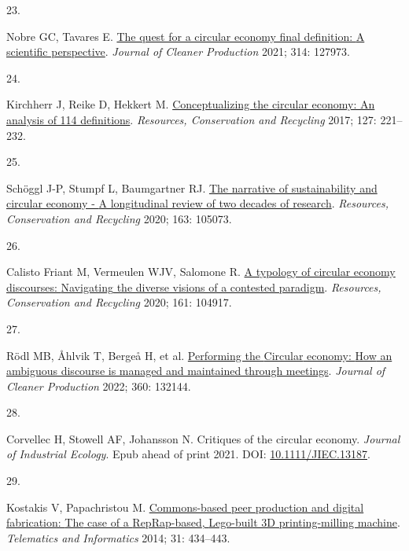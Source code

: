 \documentclass[
  12pt,
  a4paperpaper,
  onecolumn]{article}
\newlength{\cslhangindent}
\newlength{\csllabelwidth}
\newlength{\cslentryspacingunit} %
\newenvironment{CSLReferences}[2] %
 {%
  \setlength{\parindent}{0pt}
  \ifodd #1
  \let\oldpar\par
  \def\par{\hangindent=\cslhangindent\oldpar}
  \fi
  \setlength{\parskip}{#2\cslentryspacingunit}
 }%
 {}
\newcommand{\CSLLeftMargin}[1]{\parbox[t]{\csllabelwidth}{#1}}
\newcommand{\CSLRightInline}[1]{\parbox[t]{\linewidth - \csllabelwidth}{#1}\break}
\begin{document}
\begin{CSLReferences}{0}{0}
\leavevmode{}%
\CSLLeftMargin{23. }%
\CSLRightInline{Nobre GC, Tavares E.
\href{https://doi.org/10.1016/j.jclepro.2021.127973}{The quest for a
circular economy final definition: {A} scientific perspective}.
\emph{Journal of Cleaner Production} 2021; 314: 127973.}

\leavevmode{}%
\CSLLeftMargin{24. }%
\CSLRightInline{Kirchherr J, Reike D, Hekkert M.
\href{https://doi.org/10.1016/j.resconrec.2017.09.005}{Conceptualizing
the circular economy: {An} analysis of 114 definitions}.
\emph{Resources, Conservation and Recycling} 2017; 127: 221--232.}

\leavevmode{}%
\CSLLeftMargin{25. }%
\CSLRightInline{Schöggl J-P, Stumpf L, Baumgartner RJ.
\href{https://doi.org/10.1016/j.resconrec.2020.105073}{The narrative of
sustainability and circular economy - {A} longitudinal review of two
decades of research}. \emph{Resources, Conservation and Recycling} 2020;
163: 105073.}

\leavevmode{}%
\CSLLeftMargin{26. }%
\CSLRightInline{Calisto Friant M, Vermeulen WJV, Salomone R.
\href{https://doi.org/10.1016/j.resconrec.2020.104917}{A typology of
circular economy discourses: {Navigating} the diverse visions of a
contested paradigm}. \emph{Resources, Conservation and Recycling} 2020;
161: 104917.}

\leavevmode{}%
\CSLLeftMargin{27. }%
\CSLRightInline{Rödl MB, Åhlvik T, Bergeå H, et al.
\href{https://doi.org/10.1016/J.JCLEPRO.2022.132144}{Performing the
{Circular} economy: {How} an ambiguous discourse is managed and
maintained through meetings}. \emph{Journal of Cleaner Production} 2022;
360: 132144.}

\leavevmode{}%
\CSLLeftMargin{28. }%
\CSLRightInline{Corvellec H, Stowell AF, Johansson N. Critiques of the
circular economy. \emph{Journal of Industrial Ecology}. Epub ahead of
print 2021. DOI:
\href{https://doi.org/10.1111/JIEC.13187}{10.1111/JIEC.13187}.}

\leavevmode{}%
\CSLLeftMargin{29. }%
\CSLRightInline{Kostakis V, Papachristou M.
\href{https://doi.org/10.1016/j.tele.2013.09.006}{Commons-based peer
production and digital fabrication: {The} case of a {RepRap-based},
{Lego-built 3D} printing-milling machine}. \emph{Telematics and
Informatics} 2014; 31: 434--443.}


\end{CSLReferences}
\end{document}
